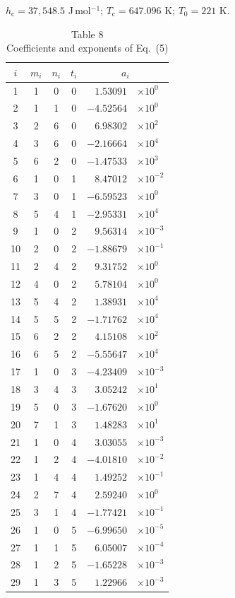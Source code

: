\documentclass[11pt]{article}
\newcommand{\Jmol}{J\,mol$^{-1}$}
\begin{document}
\begin{table}[htbp]
\vspace{2pt}
\footnotesize $h_\mathrm{c} = 37{,}548.5$ \Jmol;
$T_\mathrm{c} = 647.096$ K; $T_0 = 221$ K.
\end{table}

\begin{table}[htbp]
\centering
\footnotesize
\caption*{Table 8\\ Coefficients and exponents of Eq.~(5)}
\begin{tabular}{ccccr@{}l}
\toprule
$i$ & $m_i$ & $n_i$ & $t_i$ & \multicolumn{2}{c}{$a_i$} \\
\midrule
1  & 1 & 0 & 0 & $1.53091$   & $\times10^{0}$ \\
2  & 1 & 1 & 0 & $-4.52564$ & $\times10^{0}$ \\
3  & 2 & 6 & 0 & $6.98302$   & $\times10^{2}$ \\
4  & 3 & 6 & 0 & $-2.16664$ & $\times10^{4}$ \\
5  & 6 & 2 & 0 & $-1.47533$ & $\times10^{3}$ \\
6  & 1 & 0 & 1 & $8.47012$   & $\times10^{-2}$ \\
7  & 3 & 0 & 1 & $-6.59523$ & $\times10^{0}$ \\
8  & 5 & 4 & 1 & $-2.95331$ & $\times10^{4}$ \\
9  & 1 & 0 & 2 & $9.56314$   & $\times10^{-3}$ \\
10 & 2 & 0 & 2 & $-1.88679$ & $\times10^{-1}$ \\
11 & 2 & 4 & 2 & $9.31752$   & $\times10^{0}$ \\
12 & 4 & 0 & 2 & $5.78104$   & $\times10^{0}$ \\
13 & 5 & 4 & 2 & $1.38931$   & $\times10^{4}$ \\
14 & 5 & 5 & 2 & $-1.71762$ & $\times10^{4}$ \\
15 & 6 & 2 & 2 & $4.15108$   & $\times10^{2}$ \\
16 & 6 & 5 & 2 & $-5.55647$ & $\times10^{4}$ \\
17 & 1 & 0 & 3 & $-4.23409$ & $\times10^{-3}$ \\
18 & 3 & 4 & 3 & $3.05242$   & $\times10^{1}$ \\
19 & 5 & 0 & 3 & $-1.67620$ & $\times10^{0}$ \\
20 & 7 & 1 & 3 & $1.48283$   & $\times10^{1}$ \\
21 & 1 & 0 & 4 & $3.03055$   & $\times10^{-3}$ \\
22 & 1 & 2 & 4 & $-4.01810$ & $\times10^{-2}$ \\
23 & 1 & 4 & 4 & $1.49252$   & $\times10^{-1}$ \\
24 & 2 & 7 & 4 & $2.59240$   & $\times10^{0}$ \\
25 & 3 & 1 & 4 & $-1.77421$ & $\times10^{-1}$ \\
26 & 1 & 0 & 5 & $-6.99650$ & $\times10^{-5}$ \\
27 & 1 & 1 & 5 & $6.05007$   & $\times10^{-4}$ \\
28 & 1 & 2 & 5 & $-1.65228$ & $\times10^{-3}$ \\
29 & 1 & 3 & 5 & $1.22966$   & $\times10^{-3}$ \\
\bottomrule
\end{tabular}


\end{table}
\end{document}
